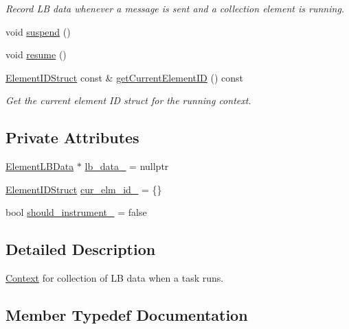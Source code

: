 \begin{DoxyCompactItemize}
\begin{DoxyCompactList}\small\item\em Record LB data whenever a message is sent and a collection element is running. \end{DoxyCompactList}\item 
void \hyperlink{structvt_1_1ctx_1_1_l_b_data_a066d5857e930ad7edb72036ba83b8517}{suspend} ()
\item 
void \hyperlink{structvt_1_1ctx_1_1_l_b_data_a378b75f6f9e5dd48866d8020436b03fe}{resume} ()
\item 
\hyperlink{structvt_1_1ctx_1_1_l_b_data_aad9fac05c3faf80173b273d900db6fb1}{Element\+I\+D\+Struct} const  \& \hyperlink{structvt_1_1ctx_1_1_l_b_data_ac2f63d7854e0c1d4c1c2b9ddf200f8c6}{get\+Current\+Element\+ID} () const
\begin{DoxyCompactList}\small\item\em Get the current element ID struct for the running context. \end{DoxyCompactList}\end{DoxyCompactItemize}
\subsection*{Private Attributes}
\begin{DoxyCompactItemize}
\item 
\hyperlink{structvt_1_1ctx_1_1_l_b_data_a11f1aeb75c01ae0c77d96f94ce1994bb}{Element\+L\+B\+Data} $\ast$ \hyperlink{structvt_1_1ctx_1_1_l_b_data_a766b2b0aa69889fc3e397c7bfbb0b68a}{lb\+\_\+data\+\_\+} = nullptr
\item 
\hyperlink{structvt_1_1ctx_1_1_l_b_data_aad9fac05c3faf80173b273d900db6fb1}{Element\+I\+D\+Struct} \hyperlink{structvt_1_1ctx_1_1_l_b_data_a8d84887a884c7f5783d4ccd7e5effd92}{cur\+\_\+elm\+\_\+id\+\_\+} = \{\}
\item 
bool \hyperlink{structvt_1_1ctx_1_1_l_b_data_a0f36387b1ed5d20e39b72e97251e0efc}{should\+\_\+instrument\+\_\+} = false
\end{DoxyCompactItemize}


\subsection{Detailed Description}
\hyperlink{structvt_1_1ctx_1_1_context}{Context} for collection of LB data when a task runs. 

\subsection{Member Typedef Documentation}
\mbox{\label{structvt_1_1ctx_1_1_l_b_data_aad9fac05c3faf80173b273d900db6fb1}} 

